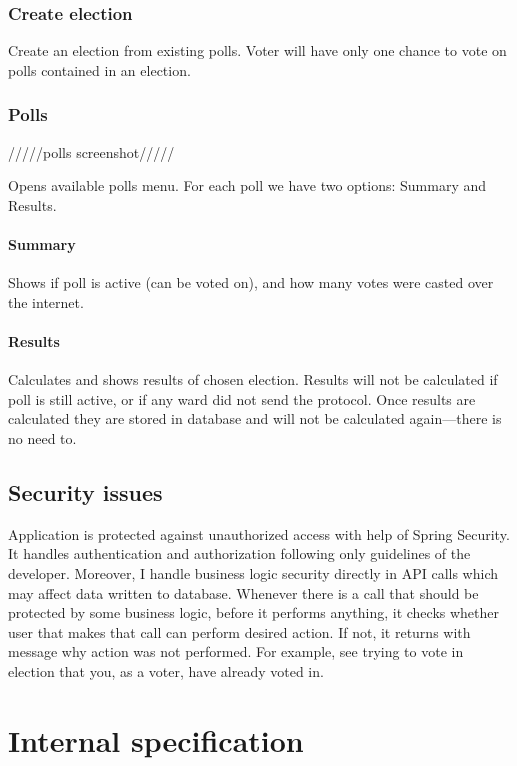 \documentclass[a4paper,twoside,12pt]{book}
\begin{document}
    \subsection{Create election}
      Create an election from existing polls. Voter will have only one chance to vote on polls contained in an election.

    \subsection{Polls}

      /////polls screenshot/////

      Opens available polls menu. For each poll we have two options: Summary and Results.

      \subsubsection{Summary}
        Shows if poll is active (can be voted on), and how many votes were casted over the internet.

      \subsubsection{Results}
        Calculates and shows results of chosen election. Results will not be calculated if poll is still active, or if any ward did not send the protocol.
        Once results are calculated they are stored in database and will not be calculated again---there is no need to.

  \section{Security issues}
    Application is protected against unauthorized access with help of Spring Security. It handles authentication and authorization following only guidelines of the developer.
    Moreover, I handle business logic security directly in API calls which may affect data written to database. 
    Whenever there is a call that should be protected by some business logic, before it performs anything, 
    it checks whether user that makes that call can perform desired action. If not, it returns with message why action was not performed. 
    For example, see trying to vote in election that you, as a voter, have already voted in.

\chapter{Internal specification}
\end{document}

